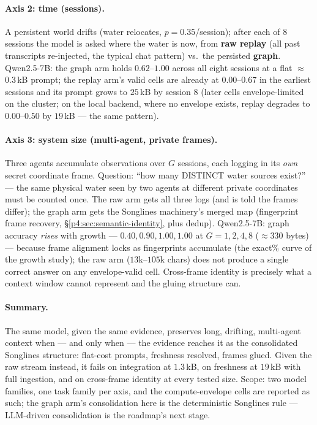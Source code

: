 \documentclass{article}
\begin{document}
\paragraph{Axis 2: time (sessions).}
A persistent world drifts (water relocates, $p{=}0.35$/session); after each of
$8$ sessions the model is asked where the water is now, from \textbf{raw
replay} (all past transcripts re-injected, the typical chat pattern) vs.\ the
persisted \textbf{graph}. Qwen2.5-7B: the graph arm holds $0.62$--$1.00$
across all eight sessions at a flat $\approx$0.3\,kB prompt; the replay arm's
valid cells are already at $0.00$--$0.67$ in the earliest sessions and its
prompt grows to $25$\,kB by session $8$ (later cells envelope-limited on the
cluster; on the local backend, where no envelope exists, replay degrades to
$0.00$--$0.50$ by $19$\,kB --- the same pattern).

\paragraph{Axis 3: system size (multi-agent, private frames).}
Three agents accumulate observations over $G$ sessions, each logging in its
\emph{own} secret coordinate frame. Question: ``how many DISTINCT water sources
exist?'' --- the same physical water seen by two agents at different private
coordinates must be counted once. The raw arm gets all three logs (and is told
the frames differ); the graph arm gets the Songlines machinery's merged map
(fingerprint frame recovery, \S\ref{p4:sec:semantic-identity}, plus dedup).
Qwen2.5-7B: graph accuracy \emph{rises} with growth --- $0.40, 0.90, 1.00,
1.00$ at $G{=}1,2,4,8$ ($\approx$330 bytes) --- because frame alignment locks
as fingerprints accumulate (the exact\% curve of the growth study); the raw arm
($13$k--$105$k chars) does not produce a single correct answer on any
envelope-valid cell. Cross-frame identity is precisely what a context window
cannot represent and the gluing structure can.

\paragraph{Summary.}
The same model, given the same evidence, preserves long, drifting, multi-agent
context when --- and only when --- the evidence reaches it as the consolidated
Songlines structure: flat-cost prompts, freshness resolved, frames glued.
Given the raw stream instead, it fails on integration at $1.3$\,kB, on
freshness at $19$\,kB with full ingestion, and on cross-frame identity at every
tested size. Scope: two model families, one task family per axis, and the
compute-envelope cells are reported as such; the graph arm's consolidation
here is the deterministic Songlines rule --- LLM-driven consolidation is the
roadmap's next stage.
\end{document}
